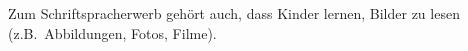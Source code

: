 Zum Schriftspracherwerb gehört auch, dass Kinder lernen, Bilder zu lesen (z.B.\ Abbildungen, Fotos, Filme).